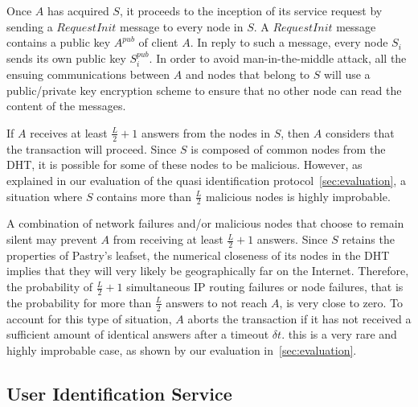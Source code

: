 Once $A$ has acquired $S$, it proceeds to the inception of its service request
by sending a $RequestInit$ message to every node in $S$. A $RequestInit$
message contains a public key $A^{pub}$ of client $A$. In reply to such a
message, every node $S_i$ sends its own public key $S^{pub}_i$. In order to
avoid man-in-the-middle attack, all the ensuing communications between $A$ and
nodes that belong to $S$ will use a public/private key encryption scheme to
ensure that no other node can read the content of the messages.

If $A$ receives at least $\frac{L}{2} + 1$ answers from the nodes in $S$, then
$A$ considers that the transaction will proceed. Since $S$ is composed of
common nodes from the DHT, it is possible for some of these nodes to be
malicious. However, as explained in our evaluation of the quasi identification
protocol~\ref{sec:evaluation}, a situation where $S$ contains more than
$\frac{L}{2}$ malicious nodes is highly improbable.

A combination of network failures and/or malicious nodes that choose to remain
silent may prevent $A$ from receiving at least $\frac{L}{2} + 1$ answers. Since
$S$ retains the properties of Pastry's leafset, the numerical closeness of its
nodes in the DHT implies that they will very likely be geographically far on
the Internet. Therefore, the probability of $\frac{L}{2} + 1 $ simultaneous IP
routing failures or node failures, that is the probability for more than
$\frac{L}{2}$ answers to not reach $A$, is very close to zero. To account for
this type of situation, $A$ aborts the transaction if it has not received a
sufficient amount of identical answers after a timeout $\delta t$. this is a
very rare and highly improbable case, as shown by our evaluation
in~\ref{sec:evaluation}.


\subsection{User Identification Service}
\label{sec:identificators}

